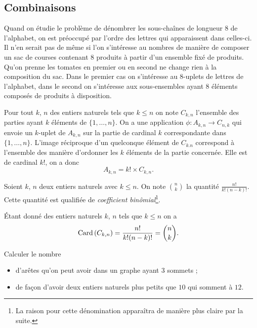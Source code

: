 \documentclass[12pt, a4paper]{article}
\begin{document}
\subsection{Combinaisons}

Quand on étudie le problème de dénombrer les sous-chaînes de longueur
$8$ de l'alphabet, on est préoccupé par l'ordre des lettres qui
apparaissent dans celles-ci. Il n'en serait pas de même si l'on
s'intéresse au nombres de manière de composer un sac de courses
contenant $8$ produits à partir d'un ensemble fixé de produits. Qu'on
prenne les tomates en premier ou en second ne change rien à la
composition du sac. Dans le premier cas on s'intéresse au $8$-uplets de
lettres de l'alphabet, dans le second on s'intéresse aux
sous-ensembles ayant $8$ éléments composés de produits à disposition.

Pour tout $k$, $n$ des entiers naturels tels que $k \leq n$ on note
$C_{k, n}$ l'ensemble des parties ayant $k$ éléments de
$\{1, \ldots, n\}$. On a une application
$\phi : A_{k, n} \to C_{n, k}$ qui envoie un $k$-uplet de $A_{k, n}$
sur la partie de cardinal $k$ correspondante dans $\{1, \ldots,
n\}$. L'image réciproque d'un quelconque élément de $C_{k. n}$
correspond à l'ensemble des manière d'ordonner les $k$ éléments de la
partie concernée. Elle est de cardinal $k!$, on a donc
\[
  A_{k, n} = k!\times C_{k, n}.
\]
\begin{nota}
  Soient $k$, $n$ deux entiers naturels avec $k \leq n$. On note
  $\binom{n}{k}$ la quantité $\frac{n!}{k!(n-k)!}$. Cette quantité est
  qualifiée de \emph{coefficient binômial}\footnote{La raison pour
    cette dénomination apparaîtra de manière plus claire par la
    suite.}.
\end{nota}

\begin{prop}
  Étant donné des entiers naturels $k$, $n$ tels que $k \leq n$ on a
  \[
    \mathrm{Card}\left(C_{k, n}\right) = \frac{n!}{k!(n-k)!} = \binom{n}{k}.
  \]
\end{prop}
\begin{question}
  Calculer le nombre
  \begin{itemize}
  \item d'arêtes qu'on peut avoir dans un graphe ayant $3$ sommets ;
  \item de fa\c{c}on d'avoir deux entiers naturels plus petits que
    $10$ qui somment à $12$.
  \end{itemize}
\end{question}
\end{document}
